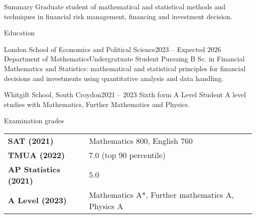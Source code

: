 \documentclass{resume} %
\begin{document}



\begin{rSection}{Summary}
Graduate student of mathematical and statistical methods and techniques in financial risk 
management, financing and investment decision. 
\end{rSection}


\begin{rSection}{Education}

  \begin{rSubsection}{London School of Economics and Political Science}{2023 -- Expected 2026}
            {Department of Mathematics}{Undergratuate Student}
      {Pursuing B Sc. in Financial Mathematics and Statistics: mathematical and statistical principles for financial decisions and investments using quantitative analysis and data handling.}
  \end{rSubsection}
  
 \begin{rSubsection}{Whitgift School, South Croydon}{2021 -- 2023}
            {Sixth form }{A Level Student}
            {A level studies with Mathematics, Further Mathematics and Physics. }
            
  \end{rSubsection}
    
\end{rSection}


\begin{rSection}{Examination grades}
\begin{tabular}{ @{} >{\bfseries}p{20em}  l }
SAT (2021) & Mathematics 800, English 760 \\
TMUA (2022) & 7.0 (top 90 percentile) \\
AP Statistics (2021) & 5.0 \\
A Level (2023) & Mathematics A*, Further mathematics A, Physics A 
\end{tabular}
\end{rSection}
\end{document}
